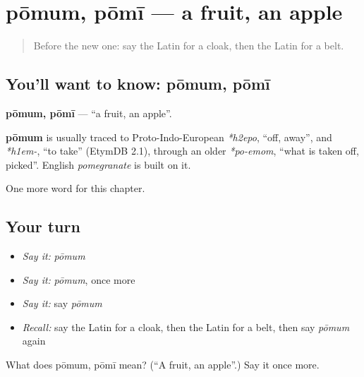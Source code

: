 \section[pōmum, pōmī]{pōmum, pōmī — a fruit, an apple}

\label{lesson:LA-C126-pomum}



\begin{quote}
Before the new one: say the Latin for a cloak, then the Latin for a belt.
\end{quote}

\subsection*{You'll want to know: pōmum, pōmī}
\textbf{pōmum, pōmī} — \textquotedblleft{}a fruit, an apple\textquotedblright{}.

\begin{cousinweb}
\textbf{pōmum} is usually traced to Proto-Indo-European \emph{*h2epo}, \textquotedblleft{}off, away\textquotedblright{}, and \emph{*h1em-}, \textquotedblleft{}to take\textquotedblright{} (EtymDB 2.1), through an older \emph{*po-emom}, \textquotedblleft{}what is taken off, picked\textquotedblright{}. English \emph{pomegranate} is built on it.
\end{cousinweb}

\begin{grammarlens}[title={What you've built}]
One more word for this chapter.
\end{grammarlens}

\subsection*{Your turn}
\begin{itemize}
\raggedright
  \item \emph{Say it:} \emph{pōmum}
  \item \emph{Say it:} \emph{pōmum}, once more
  \item \emph{Say it:} say \emph{pōmum}
  \item \emph{Recall:} say the Latin for a cloak, then the Latin for a belt, then say \emph{pōmum} again
\end{itemize}

\begin{tcolorbox}[breakable,colback=teal!4,colframe=teal!35!black,title={Before you move on}]
What does pōmum, pōmī mean? (\textquotedblleft{}A fruit, an apple\textquotedblright{}.) Say it once more.
\end{tcolorbox}
